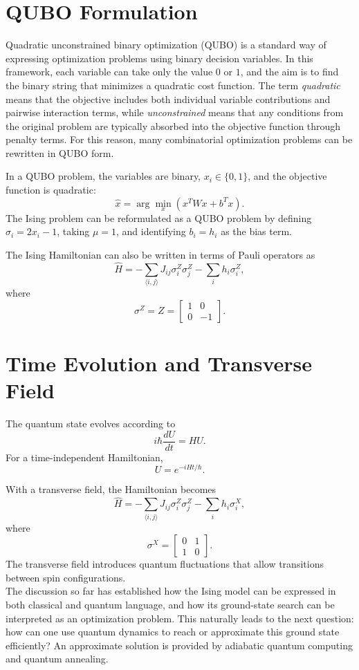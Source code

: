 \documentclass[english,12pt,a4paper]{report}
\begin{document}
\section{QUBO Formulation}\label{QUBO}
Quadratic unconstrained binary optimization (QUBO) is a standard way of expressing optimization problems using binary decision variables. In this framework, each variable can take only the value $0$ or $1$, and the aim is to find the binary string that minimizes a quadratic cost function. The term \emph{quadratic} means that the objective includes both individual variable contributions and pairwise interaction terms, while \emph{unconstrained} means that any conditions from the original problem are typically absorbed into the objective function through penalty terms. For this reason, many combinatorial optimization problems can be rewritten in QUBO form. 

In a QUBO problem, the variables are binary, $x_i\in \{0,1\}$, and the objective function is quadratic:
\[
\hat{x}=\arg\min_x(x^T W x + b^T x).
\]
The Ising problem can be reformulated as a QUBO problem by defining $\sigma_i=2x_i-1$, taking $\mu=1$, and identifying $b_i=h_i$ as the bias term.

The Ising Hamiltonian can also be written in terms of Pauli operators as
\[
\hat{H}=-\sum_{\langle i,j \rangle}J_{ij}\sigma_i^{Z}\sigma_j^{Z} -\sum_i h_i\sigma_i^Z,
\]
where
\[
\sigma^Z = Z =
\begin{bmatrix}
	1&0\\
	0&-1
\end{bmatrix}.
\]
	\section{Time Evolution and Transverse Field}
	The quantum state evolves according to
	\[
	i\hbar\frac{dU}{dt}=HU.
	\]
	For a time-independent Hamiltonian,
	\[
	U=e^{-iHt/\hbar}.
	\]
	
	With a transverse field, the Hamiltonian becomes
	\[
	\hat{H}=-\sum_{\langle i,j\rangle}J_{ij}\sigma_i^Z\sigma_j^Z-\sum_i h_i\sigma_i^X,
	\]
	where
	\[
	\sigma^X=
	\begin{bmatrix}
		0&1\\
		1&0
	\end{bmatrix}.
	\]
	The transverse field introduces quantum fluctuations that allow transitions between spin configurations.
	\\
	The discussion so far has established how the Ising model can be expressed in both classical and quantum language, and how its ground-state search can be interpreted as an optimization problem. This naturally leads to the next question: how can one use quantum dynamics to reach or approximate this ground state efficiently? An approximate solution is provided by adiabatic quantum computing and quantum annealing.
	
\end{document}
